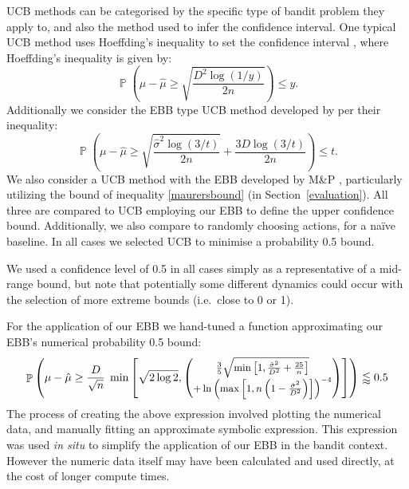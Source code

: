 \documentclass[runningheads, envcountsame, a4paper]{llncs}
\DeclareMathOperator{\p}{\mathbb{P}}
\begin{document}
UCB methods can be categorised by the specific type of bandit problem they apply to, and also the method used to infer the confidence interval.
One typical UCB method uses Hoeffding's inequality to set the confidence interval \cite{Auer2002}, where Hoeffding's inequality is given by:
\begin{equation}\label{eq:hoeffdings_simple}
\p\left(\mu-\hat{\mu}\ge\sqrt{\frac{D^2\log(1/y)}{2n}}\right) 
\le y.
\end{equation}
Additionally we consider the EBB type UCB method developed by \cite{10.1007/978-3-540-75225-7_15} per their inequality:
\begin{equation}
\p\left(\mu-\hat{\mu}\ge\sqrt{\frac{\hat{\sigma}^2\log(3/t)}{2n}} + \frac{3D\log(3/t)}{2n}\right) 
\le t.
\end{equation}
We also consider a UCB method with the EBB developed by M\&P \cite{Maurer50empiricalbernstein}, 
particularly utilizing the bound of inequality \eqref{maurersbound} (in Section~\ref{evaluation}).
All three are compared to UCB employing our EBB to define the upper confidence bound.
Additionally, we also compare to randomly choosing actions, for a na\"{i}ve baseline.
In all cases we selected UCB to minimise a probability 0.5 bound.

We used a confidence level of 0.5 in all cases simply as a representative of a mid-range bound, 
but note that potentially some different dynamics could occur with the selection of more extreme bounds (i.e.~close to 0 or 1). %

For the application of our EBB we hand-tuned a function approximating our EBB's numerical probability 0.5 bound:
\begin{equation}\label{eq:prob_bound} \p\left(\mu-\hat{\mu}\ge \frac{D}{\sqrt{n}}\; \min\left[ \sqrt{2\log 2},
\footnotesize
\left(\begin{matrix*}[c]
\frac{3}{5}\sqrt{\min\left[1,\frac{\hat{\sigma}^2}{D^2}+\frac{25}{n}\right]} \\+ \ln\left(\max\left[1,n\left(1-\frac{\hat{\sigma}^2}{D^2}\right)\right]\right)^{-4}\end{matrix*}
\normalsize
\right)\right]\right) 
\lessapprox 0.5 \end{equation}
The process of creating the above expression involved plotting the numerical data, and manually fitting an approximate symbolic expression. This expression was used \textit{in situ} to simplify the application of our EBB in the bandit context. However the numeric data itself may have been calculated and used directly, at the cost of longer compute times.
\end{document}
